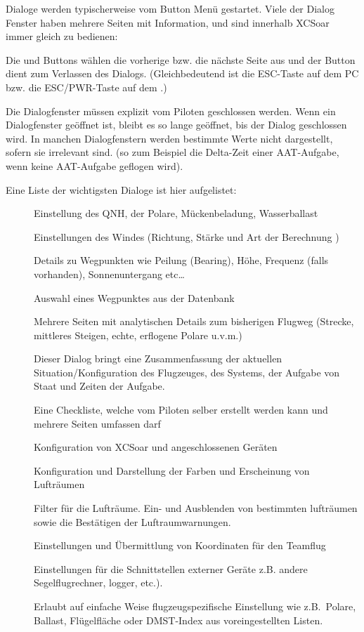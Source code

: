 Dialoge werden typischerweise vom Button Menü gestartet. Viele der Dialog Fenster haben mehrere Seiten mit Information, und sind innerhalb \textsf{XCSoar} immer gleich zu bedienen:

Die \button{$<$} und \button{$>$} Buttons wählen die vorherige bzw. die nächste Seite aus und der
 Button dient  zum Verlassen des Dialogs. (Gleichbedeutend ist die ESC-Taste auf dem \textsf{PC} bzw. die ESC/PWR-Taste  auf dem \al.)

Die Dialogfenster müssen explizit vom Piloten geschlossen werden. Wenn ein Dialogfenster geöffnet ist, bleibt es so lange geöffnet, bis der Dialog geschlossen wird. In manchen Dialogfenstern werden bestimmte  Werte nicht dargestellt, sofern sie irrelevant sind. (so zum Beispiel die Delta-Zeit einer AAT-Aufgabe, wenn keine AAT-Aufgabe geflogen wird).


Eine Liste der wichtigsten Dialoge ist hier aufgelistet:
\begin{description}
\item[] Einstellung des QNH, der Polare, Mückenbeladung, Wasserballast
\item[] Einstellungen des Windes (Richtung, Stärke und Art der Berechnung )
\item[] Details zu Wegpunkten wie Peilung (Bearing), Höhe, Frequenz (falls vorhanden), Sonnenuntergang  etc\dots
\item[] Auswahl eines Wegpunktes aus der Datenbank
\item[] Mehrere Seiten mit analytischen Details zum bisherigen Flugweg (Strecke, mittleres Steigen, echte, erflogene Polare u.v.m.)
\item[] Dieser Dialog bringt eine Zusammenfassung der aktuellen Situation/Konfiguration  des Flugzeuges, des Systems, der Aufgabe von Staat und Zeiten der Aufgabe.
\item[] Eine Checkliste, welche vom Piloten selber erstellt werden kann und mehrere Seiten umfassen darf
\item[] Konfiguration von  \textsf{XCSoar} und angeschlossenen Geräten
\item[] Konfiguration und Darstellung der Farben und Erscheinung von Lufträumen
\item[] Filter für die Lufträume. Ein- und Ausblenden von bestimmten lufträumen sowie die Bestätigen der Luftraumwarnungen.
\item[] Einstellungen und Übermittlung von Koordinaten für den Teamflug
\item[] Einstellungen für die Schnittstellen externer Geräte z.B.  andere Segelflugrechner,  logger, \fl etc.).
\item[] Erlaubt auf einfache Weise flugzeugspezifische Einstellung wie z.B.\ Polare, Ballast, Flügelfläche oder DMST-Index aus voreingestellten Listen.
\end{description}


